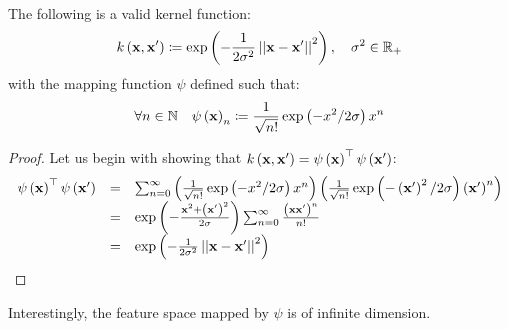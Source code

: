 ~\\
\begin{claim}
	The following is a valid kernel function: $$ k\left(\mathbf{x},\mathbf{x}'\right)\coloneqq \exp\left(-\frac{1}{2\sigma^2}\left|\left| \mathbf{x}-\mathbf{x}'\right|\right|^2\right),\quad\sigma^2\in\mathbb{R}_+ $$ with the mapping function $\psi$ defined such that: $$ \forall n\in\mathbb{N} \quad \psi\left(\mathbf{x}\right)_n \coloneqq \frac{1}{\sqrt{n!}}\exp\left(-x^2/2\sigma\right) x^n $$
\end{claim}
\begin{proof}
	Let us begin with showing that $k\left(\mathbf{x},\mathbf{x}'\right) = \psi\left(\mathbf{x}\right)^\top \psi\left(\mathbf{x}'\right)$:
	$$
	\begin{array}{ccl}
		\psi\left(\mathbf{x}\right)^\top \psi\left(\mathbf{x}'\right) & = & \sum_{n=0}^\infty \left(\frac{1}{\sqrt{n!}}\exp\left(-x^2/2\sigma\right) x^n\right) \left(\frac{1}{\sqrt{n!}}\exp\left(-\left(\mathbf{x}'\right)^2/2\sigma\right) \left(\mathbf{x}'\right)^n\right)\\
		& = & \exp\left(-\frac{\mathbf{x}^2 +\left(\mathbf{x}'\right)^2}{2\sigma}\right)\sum_{n=0}^\infty \frac{\left(\mathbf{x}\mathbf{x}'\right)^n}{n!}\\
		& = & \exp\left(-\frac{1}{2\sigma^2}\left|\left| \mathbf{x}-\mathbf{x}'\right|\right|^2\right)
	\end{array}
	$$
\end{proof}
Interestingly, the feature space mapped by $\psi$ is of infinite dimension.

